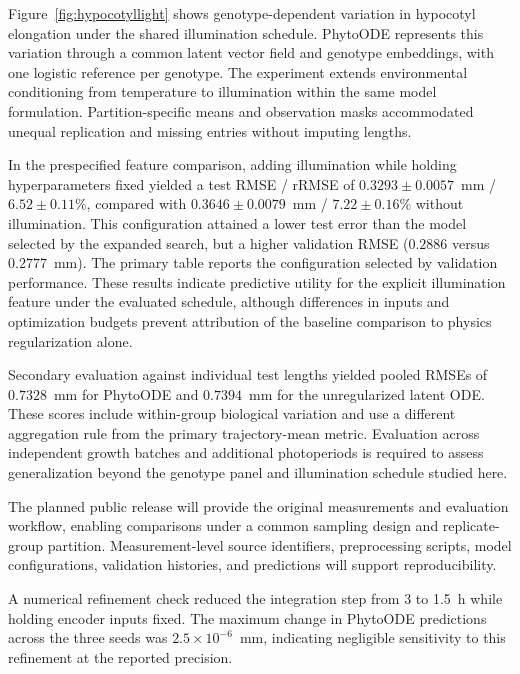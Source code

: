 Figure~\ref{fig:hypocotyllight} shows genotype-dependent variation in hypocotyl elongation under the shared illumination schedule. PhytoODE represents this variation through a common latent vector field and genotype embeddings, with one logistic reference per genotype. The experiment extends environmental conditioning from temperature to illumination within the same model formulation. Partition-specific means and observation masks accommodated unequal replication and missing entries without imputing lengths.

In the prespecified feature comparison, adding illumination while holding hyperparameters fixed yielded a test RMSE / rRMSE of $0.3293\pm0.0057$~mm / $6.52\pm0.11\%$, compared with $0.3646\pm0.0079$~mm / $7.22\pm0.16\%$ without illumination. This configuration attained a lower test error than the model selected by the expanded search, but a higher validation RMSE ($0.2886$ versus $0.2777$~mm). The primary table reports the configuration selected by validation performance. These results indicate predictive utility for the explicit illumination feature under the evaluated schedule, although differences in inputs and optimization budgets prevent attribution of the baseline comparison to physics regularization alone.

Secondary evaluation against individual test lengths yielded pooled RMSEs of $0.7328$~mm for PhytoODE and $0.7394$~mm for the unregularized latent ODE. These scores include within-group biological variation and use a different aggregation rule from the primary trajectory-mean metric. Evaluation across independent growth batches and additional photoperiods is required to assess generalization beyond the genotype panel and illumination schedule studied here.

The planned public release will provide the original measurements and evaluation workflow, enabling comparisons under a common sampling design and replicate-group partition. Measurement-level source identifiers, preprocessing scripts, model configurations, validation histories, and predictions will support reproducibility.

A numerical refinement check reduced the integration step from 3 to 1.5~h while holding encoder inputs fixed. The maximum change in PhytoODE predictions across the three seeds was $2.5\times10^{-6}$~mm, indicating negligible sensitivity to this refinement at the reported precision.

\FloatBarrier
